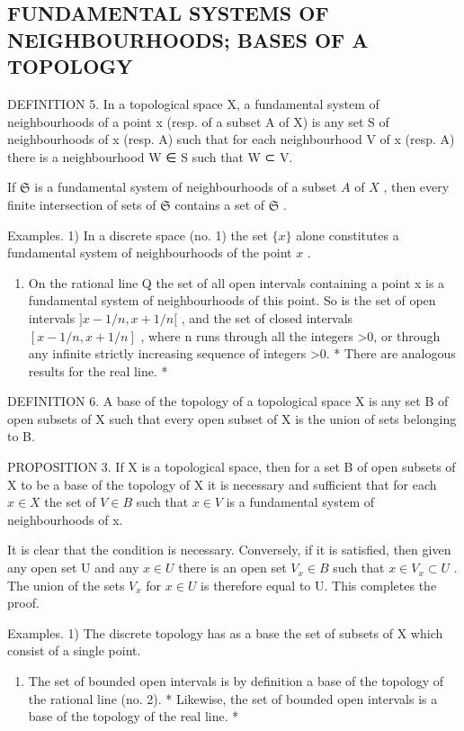 \subsection{FUNDAMENTAL SYSTEMS OF NEIGHBOURHOODS; BASES OF A TOPOLOGY}

DEFINITION 5. In a topological space X, a fundamental system of neighbourhoods of a point x (resp. of a subset A of X) is any set S of neighbourhoods of x (resp. A) such that for each neighbourhood V of x (resp. A) there is a neighbourhood W ∈ S such that W ⊂ V.

If \(\mathfrak{S}\) is a fundamental system of neighbourhoods of a subset \(A\) of \(X\) , then every finite intersection of sets of \(\mathfrak{S}\) contains a set of \(\mathfrak{S}\) .

Examples. 1) In a discrete space (no. 1) the set \(\{x\}\) alone constitutes a fundamental system of neighbourhoods of the point \(x\) .

\begin{enumerate}
\def\labelenumi{\arabic{enumi})}
\setcounter{enumi}{1}
\tightlist
\item
  On the rational line Q the set of all open intervals containing a point x is a fundamental system of neighbourhoods of this point. So is the set of open intervals \(]x - 1/n, x + 1/n[\) , and the set of closed intervals \([x - 1/n, x + 1/n]\) , where n runs through all the integers \textgreater0, or through any infinite strictly increasing sequence of integers \textgreater0. * There are analogous results for the real line. *
\end{enumerate}

DEFINITION 6. A base of the topology of a topological space X is any set B of open subsets of X such that every open subset of X is the union of sets belonging to B.

PROPOSITION 3. If X is a topological space, then for a set B of open subsets of X to be a base of the topology of X it is necessary and sufficient that for each \(x \in X\) the set of \(V \in B\) such that \(x \in V\) is a fundamental system of neighbourhoods of x.

It is clear that the condition is necessary. Conversely, if it is satisfied, then given any open set U and any \(x \in U\) there is an open set \(V_{x} \in B\) such that \(x \in V_{x} \subset U\) . The union of the sets \(V_{x}\) for \(x \in U\) is therefore equal to U. This completes the proof.

Examples. 1) The discrete topology has as a base the set of subsets of X which consist of a single point.

\begin{enumerate}
\def\labelenumi{\arabic{enumi})}
\setcounter{enumi}{1}
\tightlist
\item
  The set of bounded open intervals is by definition a base of the topology of the rational line (no. 2). * Likewise, the set of bounded open intervals is a base of the topology of the real line. *
\end{enumerate}

